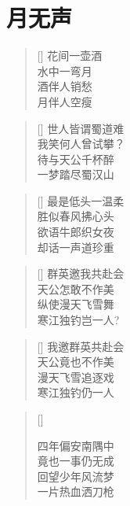 \chapter{月无声}
\thispagestyle{empty}

\renewcommand{\poemtoc}{section}
\settowidth{\versewidth}{花间一壶酒}
\begin{verse}[\versewidth]
花间一壶酒\\
水中一弯月\\
酒伴人销愁\\
月伴人空瘦
\end{verse}

\renewcommand{\poemtoc}{section}
\settowidth{\versewidth}{世人皆谓蜀道难}
\begin{verse}[\versewidth]
世人皆谓蜀道难\\
我笑何人曾试攀？\\
待与天公千杯醉\\
一梦踏尽蜀汉山
\end{verse}

\renewcommand{\poemtoc}{section}
\settowidth{\versewidth}{最是低头一温柔}
\begin{verse}[\versewidth]
最是低头一温柔\\
胜似春风拂心头\\
欲语牛郎织女夜\\
却话一声道珍重
\end{verse}

\renewcommand{\poemtoc}{section}
\settowidth{\versewidth}{群英邀我共赴会}
\begin{verse}[\versewidth]
群英邀我共赴会\\
天公怎敢不作美\\
纵使漫天飞雪舞\\
寒江独钓岂一人?
\end{verse}

\renewcommand{\poemtoc}{section}
\settowidth{\versewidth}{群英邀我共赴会}
\begin{verse}[\versewidth]
我邀群英共赴会\\
天公竟也不作美\\
漫天飞雪追逐戏\\
寒江独钓仍一人
\end{verse}
\newpage

\renewcommand{\poemtoc}{section}
\settowidth{\versewidth}{四年偏安南隅中}
\begin{verse}[\versewidth]

四年偏安南隅中\\
竟也一事仍无成\\
回望少年风流梦\\
一片热血洒刀枪
\end{verse}

